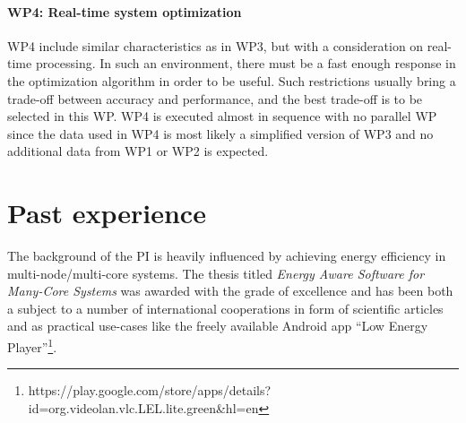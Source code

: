 \documentclass{article}
\begin{document}
\paragraph{WP4: Real-time system optimization}
WP4 include similar characteristics as in WP3, but with a consideration on real-time processing.
In such an environment, there must be a fast enough response in the optimization algorithm in order to be useful.
Such restrictions usually bring a trade-off between accuracy and performance, and the best trade-off is to be selected in this WP.
WP4 is executed almost in sequence with no parallel WP since the data used in WP4 is most likely a simplified version of WP3 and no additional data from WP1 or WP2 is expected.

\section{Past experience}
The background of the PI is heavily influenced by achieving energy efficiency in multi-node/multi-core systems.
The thesis titled \textit{Energy Aware Software for Many-Core Systems} \cite{Holmbacka:15} was awarded with the grade of excellence and has been both a subject to a number of international cooperations in form of scientific articles and as practical use-cases like the freely available Android app ``Low Energy Player''\footnote{https://play.google.com/store/apps/details?id=org.videolan.vlc.LEL.lite.green\&hl=en}. \vspace{0.2cm}
\end{document}
